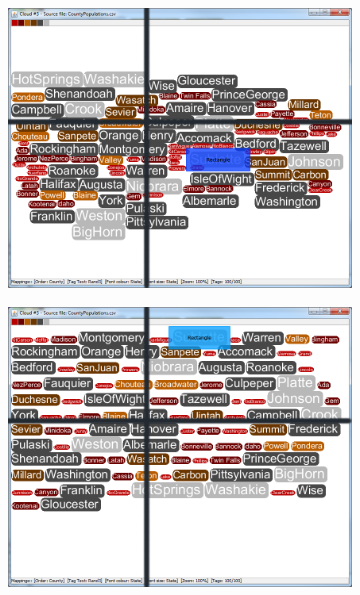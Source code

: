 \begin{figure}[!htb]
\begin{subfigure}{.5\textwidth}
  \includegraphics[scale=0.25]{Experiment2/T3/M3Spiral.png}
\end{subfigure}%
\begin{subfigure}{.5\textwidth}
  \centering
 \includegraphics[scale=0.25]{Experiment2/T3/M3Typewriter.png}
\end{subfigure}
\begin{subfigure}{.5\textwidth}
  \centering

\end{subfigure}
\end{figure}
